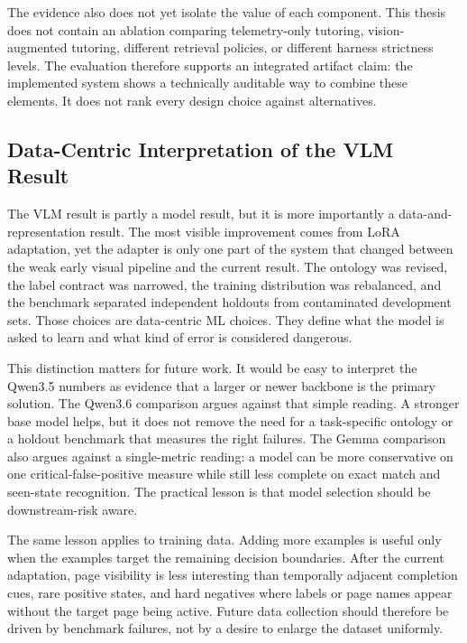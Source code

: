 The evidence also does not yet isolate the value of each component. This thesis
does not contain an ablation comparing telemetry-only tutoring, vision-augmented
tutoring, different retrieval policies, or different harness strictness levels.
The evaluation therefore supports an integrated artifact claim: the implemented
system shows a technically auditable way to combine these elements. It does not
rank every design choice against alternatives.

\subsection{Data-Centric Interpretation of the VLM Result}

The VLM result is partly a model result, but it is more importantly a
data-and-representation result. The most visible improvement comes from LoRA
adaptation, yet the adapter is only one part of the system that changed between
the weak early visual pipeline and the current result. The ontology was revised,
the label contract was narrowed, the training distribution was rebalanced, and
the benchmark separated independent holdouts from contaminated development
sets. Those choices are data-centric ML choices. They define what the model is
asked to learn and what kind of error is considered dangerous.

This distinction matters for future work. It would be easy to interpret the
Qwen3.5 numbers as evidence that a larger or newer backbone is the primary
solution. The Qwen3.6 comparison argues against that simple reading. A stronger
base model helps, but it does not remove the need for a task-specific ontology
or a holdout benchmark that measures the right failures. The Gemma comparison
also argues against a single-metric reading: a model can be more conservative
on one critical-false-positive measure while still less complete on exact match
and seen-state recognition. The practical lesson is that model selection should
be downstream-risk aware.

The same lesson applies to training data. Adding more examples is useful only
when the examples target the remaining decision boundaries. After the current
adaptation, page visibility is less interesting than temporally adjacent
completion cues, rare positive states, and hard negatives where labels or page
names appear without the target page being active. Future data collection
should therefore be driven by benchmark failures, not by a desire to enlarge
the dataset uniformly.

